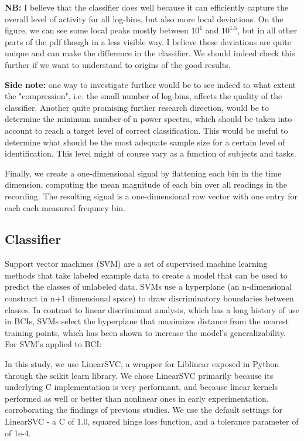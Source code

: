 {\bf NB:} I believe that the classifier does well because it can efficiently capture the overall level of activity for all log-bins, but also more local deviations. On the figure, we can see some local peaks mostly between $10^1$ and $10^1.5$, but in all other parts of the pdf though in a less visible way. I believe these deviations are quite unique and can make the difference in the classifier. We should indeed check this further if we want to understand to origins of the good results.

{\bf Side note:} one way to investigate further would be to see indeed to what extent the "compression", i.e. the small number of log-bins, affects the quality of the classifier. Another quite promising further research direction, would be to determine the minimum number of n power spectra, which should be taken into account to reach a target level of correct classification. This would be useful to determine what should be the most adequate sample size for a certain level of identification. This level might of course vary as a function of subjects and tasks.


Finally, we create a one-dimensional signal by flattening each bin in the time dimension, computing the mean magnitude of each bin over all readings in the recording. The resulting signal is a one-dimensional row vector with one entry for each each measured frequncy bin.


\subsection{Classifier}

Support vector machines (SVM) are a set of supervised machine learning methods that take labeled example data to create a model that can be used to predict the classes of unlabeled data. SVMs use a hyperplane (an n-dimensional construct in n+1 dimensional space) to draw discriminatory boundaries between classes. In contrast to linear discriminant analysis, which has a long history of use in BCIs, SVMs select the hyperplane that maximizes distance from the nearest training points, which has been shown to increase the model's generalizability. \cite{burges_tutorial_1998} For SVM's applied to BCI: \cite{garrett_comparison_2003,garrett_comparison_2003,grierson_better_2011} 

In this study, we use LinearSVC, \cite{fan_liblinear:_2008} a wrapper for Liblinear exposed in Python through the scikit learn library. \cite{pedregosa_scikit-learn:_2011} We chose LinearSVC primarily because its underlying C implementation is very performant, and because linear kernels performed as well or better than nonlinear ones in early experimentation, corroborating the findings of previous studies. \cite{garrett_comparison_2003,lotte_review_2007} We use the default settings for LinearSVC - a C of 1.0, squared hinge loss function, and a tolerance parameter of of 1e-4.


